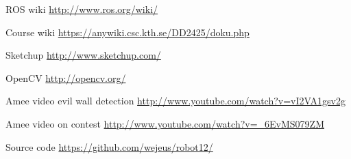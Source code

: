 \begin{thebibliography}{9}

  
  ROS wiki
  \url{http://www.ros.org/wiki/}
  
  Course wiki
  \url{https://anywiki.csc.kth.se/DD2425/doku.php}
  
  Sketchup
  \url{http://www.sketchup.com/}
  
  OpenCV
  \url{http://opencv.org/}
  
  Amee video evil wall detection
  \url{http://www.youtube.com/watch?v=vI2VA1gsv2g}
  
  Amee video on contest
  \url{http://www.youtube.com/watch?v=_6EvMS079ZM}
  
  Source code
  \url{https://github.com/wejeus/robot12/}

\end{thebibliography}